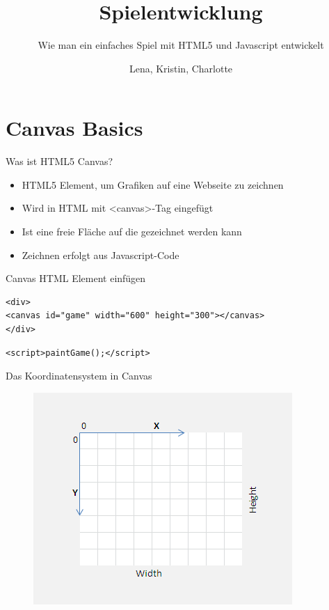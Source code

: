 \documentclass[18pt]{beamer}
\title[Javascript Basics]{Spielentwicklung}
\subtitle{Wie man ein einfaches Spiel mit HTML5 und Javascript entwickelt}
\author{Lena, Kristin, Charlotte}
\begin{document}

\begin{frame}
\titlepage
\end{frame}

\section{Canvas Basics}

\begin{frame}[fragile]{Was ist HTML5 Canvas?}
\begin{itemize}
	\item HTML5 Element, um Grafiken auf eine Webseite zu zeichnen
	\item Wird in HTML mit \textless canvas\textgreater  -Tag eingefügt 
	\item Ist eine freie Fläche auf die gezeichnet werden kann
	\item Zeichnen erfolgt aus Javascript-Code
\end{itemize}
\end{frame}

\begin{frame}[fragile]{Canvas HTML Element einfügen}
\begin{lstlisting}
<div>
<canvas id="game" width="600" height="300"></canvas>
</div>
\end{lstlisting}
\begin{lstlisting}
<script>paintGame();</script>
\end{lstlisting}
\end{frame}

\begin{frame}{Das Koordinatensystem in Canvas}
\begin{figure}[htb]
	\centering
	\includegraphics{logos/canvascos}
\end{figure}
\end{frame}
\end{document}
